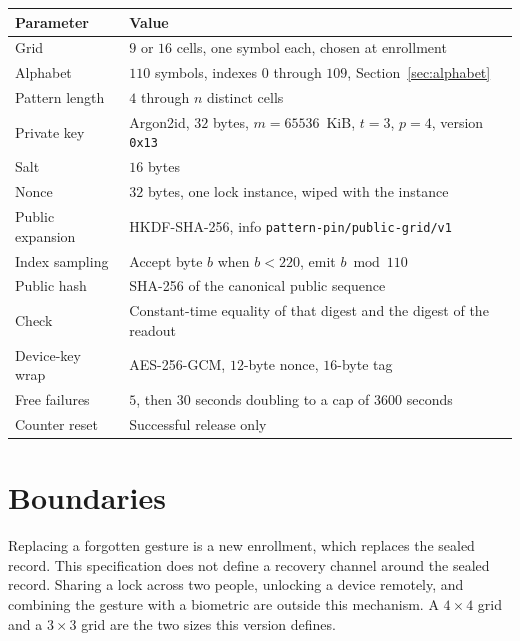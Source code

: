 \documentclass[11pt]{article}
\begin{document}
\begin{center}
\begin{tabular}{@{}lp{3.55in}@{}}
  \toprule
  Parameter & Value \\
  \midrule
  Grid & \(9\) or \(16\) cells, one symbol each, chosen at enrollment \\
  Alphabet & \(110\) symbols, indexes \(0\) through \(109\), Section~\ref{sec:alphabet} \\
  Pattern length & \(4\) through \(n\) distinct cells \\
  Private key & Argon2id, \(32\) bytes, \(m=65536\)~KiB, \(t=3\), \(p=4\), version \texttt{0x13} \\
  Salt & \(16\) bytes \\
  Nonce & \(32\) bytes, one lock instance, wiped with the instance \\
  Public expansion & HKDF-SHA-256, info \texttt{pattern-pin/public-grid/v1} \\
  Index sampling & Accept byte \(b\) when \(b < 220\), emit \(b \bmod 110\) \\
  Public hash & SHA-256 of the canonical public sequence \\
  Check & Constant-time equality of that digest and the digest of the readout \\
  Device-key wrap & AES-256-GCM, \(12\)-byte nonce, \(16\)-byte tag \\
  Free failures & \(5\), then \(30\) seconds doubling to a cap of \(3600\) seconds \\
  Counter reset & Successful release only \\
  \bottomrule
\end{tabular}
\end{center}

\section{Boundaries}

Replacing a forgotten gesture is a new enrollment, which replaces the sealed record.
This specification does not define a recovery channel around the sealed record.
Sharing a lock across two people, unlocking a device remotely, and combining the gesture with a biometric are outside this mechanism.
A \(4 \times 4\) grid and a \(3 \times 3\) grid are the two sizes this version defines.
\end{document}
